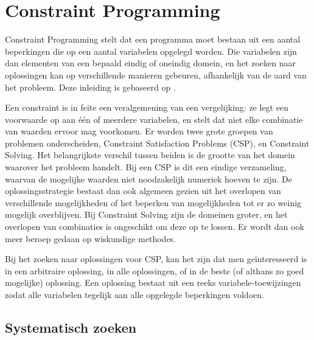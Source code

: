 \section{Constraint Programming}

Constraint Programming stelt dat een programma moet bestaan uit een aantal beperkingen die op een aantal variabelen opgelegd worden. Die variabelen zijn dan elementen van een bepaald eindig of oneindig domein, en het zoeken naar oplossingen kan op verschillende manieren gebeuren, afhankelijk van de aard van het probleem. Deze inleiding is gebaseerd op \cite{bartak99constraint}.

Een constraint is in feite een veralgemening van een vergelijking: ze legt een voorwaarde op aan \'e\'en of meerdere variabelen, en stelt dat niet elke combinatie van waarden ervoor mag voorkomen. Er worden twee grote groepen van problemen onderscheiden, Constraint Satisfaction Problems (CSP), en Constraint Solving. Het belangrijkste verschil tussen beiden is de grootte van het domein waarover het probleem handelt. Bij een CSP is dit een eindige verzameling, waarvan de mogelijke waarden niet noodzakelijk numeriek hoeven te zijn. De oplossingsstrategie bestaat dan ook algemeen gezien uit het overlopen van verschillende mogelijkheden of het beperken van mogelijkheden tot er zo weinig mogelijk overblijven. Bij Constraint Solving zijn de domeinen groter, en het overlopen van combinaties is ongeschikt om deze op te lossen. Er wordt dan ook meer beroep gedaan op wiskundige methodes.

Bij het zoeken naar oplossingen voor CSP, kan het zijn dat men ge\"interesseerd is in een arbitraire oplossing, in alle oplossingen, of in de beste (of althans zo goed mogelijke) oplossing. Een oplossing bestaat uit een reeks variabele-toewijzingen zodat alle variabelen tegelijk aan alle opgelegde beperkingen voldoen.

\subsection{Systematisch zoeken}

